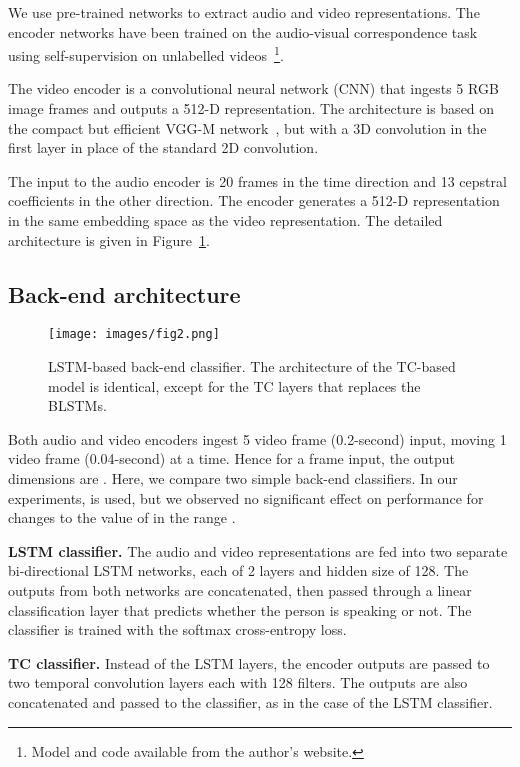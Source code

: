 \documentclass[10pt,twocolumn,letterpaper]{article}
\begin{document}
We use pre-trained networks to extract audio and video representations. The encoder networks have been trained on the audio-visual correspondence task using self-supervision on unlabelled videos~\cite{chung2018perfect}\footnote{Model and code available from the author's website.}. 

The video encoder is a convolutional neural network (CNN) that ingests 5 RGB image frames  and outputs a 512-D representation. The architecture is based on the compact but efficient VGG-M network~\cite{Chatfield14}, but with a 3D convolution in the first layer in place of the standard 2D convolution.

The input to the audio encoder is 20 frames in the time direction and 13 cepstral coefficients in the other direction. The encoder  generates a 512-D representation in the same embedding space as the video representation. The detailed architecture is given in Figure~\ref{fig:streams}.


\subsection{Back-end architecture}

\begin{figure}[ht]
\centering
\texttt{[image: images/fig2.png]}
\caption{LSTM-based back-end classifier. The architecture of the TC-based model is identical, except for the TC layers that replaces the BLSTMs.}
\label{fig:streams}
\end{figure}

Both audio and video encoders ingest 5 video frame (0.2-second) input, moving 1 video frame (0.04-second) at a time. Hence for a  frame input, the output dimensions are . Here, we compare two simple back-end classifiers. In our experiments,   is used, but we observed no significant effect on performance for changes to the value of  in the range  .

\newpara\noindent\textbf{LSTM classifier.} 
The audio and video representations are fed into two separate bi-directional LSTM networks, each of 2 layers and hidden size of 128. The outputs from both networks are concatenated, then passed through a linear classification layer that predicts whether the person is speaking or not. The classifier is trained with the softmax cross-entropy loss.

\newpara\noindent\textbf{TC classifier.} 
Instead of the LSTM layers, the encoder outputs are passed to two temporal convolution layers each with 128 filters. The outputs are also concatenated and passed to the classifier, as in the case of the LSTM classifier.
\end{document}
